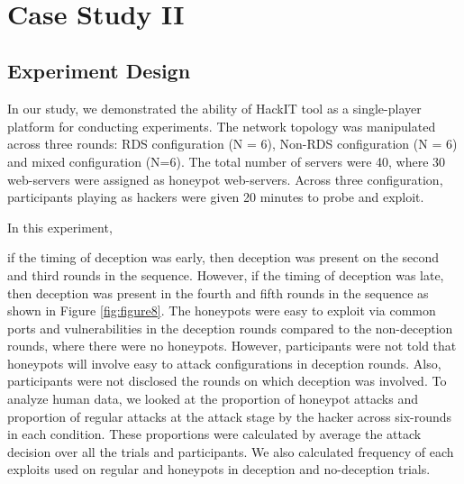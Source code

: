 \clearpage
\thispagestyle{empty}
~\clearpage
\chapter{Case Study II}
\label{chap5}
\section{Experiment Design}
In our study, we demonstrated the ability of HackIT tool as a single-player platform for conducting experiments. The network topology was manipulated across three rounds: RDS configuration (N = 6), Non-RDS configuration (N = 6) and mixed configuration (N=6). The total number of servers were 40, where 30 web-servers were assigned as honeypot web-servers. Across three configuration, participants playing as hackers were given 20 minutes to probe and exploit.

In this experiment, 


if the timing of deception was early, then deception was present on the second and third rounds in the sequence. However, if the timing of deception was late, then deception was present in the fourth and fifth rounds in the sequence as shown in Figure \ref{fig:figure8}. The honeypots were easy to exploit via common ports and vulnerabilities in the deception rounds compared to the non-deception rounds, where there were no honeypots. However, participants were not told that honeypots will involve easy to attack configurations in deception rounds. Also, participants were not disclosed the rounds on which deception was involved. To analyze human data, we looked at the proportion of honeypot attacks and proportion of regular attacks at the attack stage by the hacker across six-rounds in each condition. These proportions were calculated by average the attack decision over all the trials and participants. We also calculated frequency of each exploits used on regular and honeypots in deception and no-deception trials.

